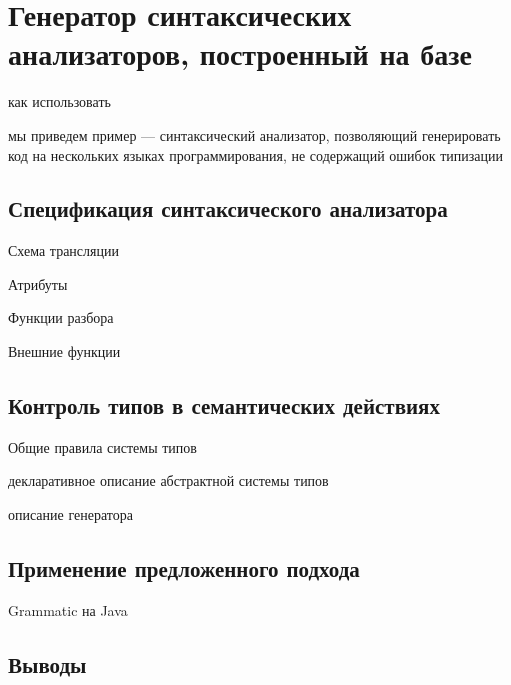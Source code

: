 \part{Генератор синтаксических анализаторов, построенный на базе }\label{part3}

как использовать 

мы приведем пример --- синтаксический анализатор, позволяющий генерировать код на нескольких языках программирования, не содержащий ошибок типизации

\chapter{Спецификация синтаксического анализатора}

Схема трансляции

Атрибуты

Функции разбора

Внешние функции

\chapter{Контроль типов в семантических действиях}

Общие правила системы типов

декларативное описание абстрактной системы типов

описание генератора

\chapter{Применение предложенного подхода}

Grammatic на Java

\chapter{Выводы}